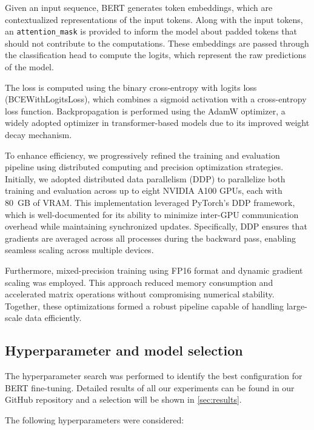 Given an input sequence, BERT generates token embeddings, which are contextualized representations of the input tokens. Along with the input tokens, an \texttt{attention\_mask} is provided to inform the model about padded tokens that should not contribute to the computations. These embeddings are passed through the classification head to compute the logits, which represent the raw predictions of the model.

The loss is computed using the binary cross-entropy with logits loss (BCEWithLogitsLoss), which combines a sigmoid activation with a cross-entropy loss function. Backpropagation is performed using the AdamW optimizer, a widely adopted optimizer in transformer-based models due to its improved weight decay mechanism. \cite{Loshchilov2017}

To enhance efficiency, we progressively refined the training and evaluation pipeline using distributed computing and precision optimization strategies. Initially, we adopted distributed data parallelism (DDP) to parallelize both training and evaluation across up to eight NVIDIA A100 GPUs, each with 80~GB of VRAM. This implementation leveraged PyTorch's DDP framework, which is well-documented for its ability to minimize inter-GPU communication overhead while maintaining synchronized updates. Specifically, DDP ensures that gradients are averaged across all processes during the backward pass, enabling seamless scaling across multiple devices. \cite{PyTorch2023}

Furthermore, mixed-precision training using FP16 format and dynamic gradient scaling was employed. This approach reduced memory consumption and accelerated matrix operations without compromising numerical stability. Together, these optimizations formed a robust pipeline capable of handling large-scale data efficiently. \cite{PyTorch2023a}

\subsection{Hyperparameter and model selection}

The hyperparameter search was performed to identify the best configuration for BERT fine-tuning. Detailed results of all our experiments can be found in our GitHub repository and a selection will be shown in \cref{sec:results}. \cite{Queisler2024}

\noindent The following hyperparameters were considered:

